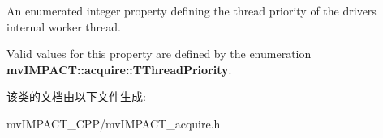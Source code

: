 An enumerated integer property defining the thread priority of the drivers internal worker thread. 

Valid values for this property are defined by the enumeration {\bfseries mv\+I\+M\+P\+A\+C\+T\+::acquire\+::\+T\+Thread\+Priority}. 

该类的文档由以下文件生成\+:\begin{DoxyCompactItemize}
\item 
mv\+I\+M\+P\+A\+C\+T\+\_\+\+C\+P\+P/mv\+I\+M\+P\+A\+C\+T\+\_\+acquire.\+h\end{DoxyCompactItemize}
